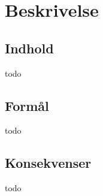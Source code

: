 \thispagestyle{fancy}
\chapter{Beskrivelse}
\label{chp:description}

\section{Indhold}
todo

\section{Formål}
todo

\section{Konsekvenser}
todo